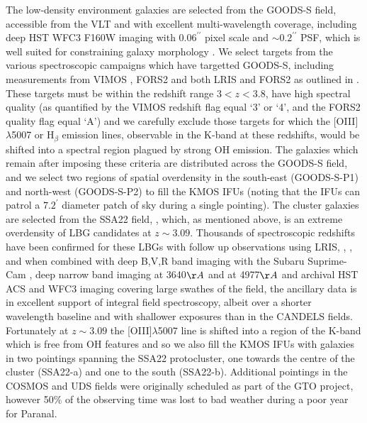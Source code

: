 \documentclass[fleqn,usenatbib]{mn2e}
\begin{document}
The low-density environment galaxies are selected from the GOODS-S field, accessible from the VLT and with excellent multi-wavelength coverage, including deep HST WFC3 F160W imaging with $ 0.06^{\prime\prime}$ pixel scale and $ \sim 0.2^{\prime\prime}$ PSF, which is well suited for constraining galaxy morphology \citep{Grogin2011,Koekemoer2011}.
We select targets from the various spectroscopic campaigns which have targetted GOODS-S, including measurements from VIMOS \citep{Balestra2010,Cassata2014}, FORS2 \citep{Vanzella2005,Vanzella2006,Vanzella2008} and both LRIS and FORS2 as outlined in \cite{Wuyts2009}.
These targets must be within the redshift range $3 < z < 3.8$, have high spectral quality (as quantified by the VIMOS redshift flag equal `3' or `4', and the FORS2 quality flag equal `A') and we carefully exclude those targets for which the [OIII]$\lambda$5007 or H$_{\beta}$ emission lines, observable in the K-band at these redshifts, would be shifted into a spectral region plagued by strong OH emission.
The galaxies which remain after imposing these criteria are distributed across the GOODS-S field, and we select two regions of spatial overdensity in the south-east (GOODS-S-P1) and north-west (GOODS-S-P2) to fill the KMOS IFUs (noting that the IFUs can patrol a $7.2^{\prime}$ diameter patch of sky during a single pointing).
The cluster galaxies are selected from the SSA22 field, \citep{Steidel1998,Steidel2000,Steidel2003,Shapley2003}, which, as mentioned above, is an extreme overdensity of LBG candidates at $z \sim 3.09$.
Thousands of spectroscopic redshifts have been confirmed for these LBGs with follow up observations using LRIS, \citep{Shapley2003}, \citep{Nestor2013}, and when combined with deep B,V,R band imaging with the Subaru Suprime-Cam \citep{Matsuda2004}, deep narrow band imaging at 3640$\AA$ \citep{Matsuda2004} and at 4977$\AA$ \citep{Nestor2011} and archival HST ACS and WFC3 imaging covering large swathes of the field, the ancillary data is in excellent support of integral field spectroscopy, albeit over a shorter wavelength baseline and with shallower exposures than in the CANDELS fields.
Fortunately at $z \sim 3.09$ the [OIII]$\lambda$5007 line is shifted into a region of the K-band which is free from OH features and so we also fill the KMOS IFUs with galaxies in two pointings spanning the SSA22 protocluster, one towards the centre of the cluster (SSA22-a) and one to the south (SSA22-b). Additional pointings in the COSMOS and UDS fields were originally scheduled as part of the GTO project, however 50$\%$ of the observing time was lost to bad weather during a poor year for Paranal.
\end{document}
